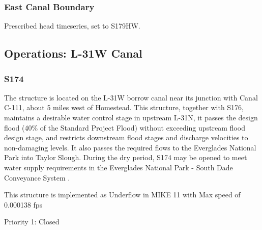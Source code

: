 \clearpage
\subsubsection{East Canal Boundary}
Prescribed head timeseries, set to S179HW.


\clearpage
\subsection{Operations: L-31W Canal}

\subsubsection{S174}

The structure is located on the L-31W borrow canal near its junction with Canal C-111, about 5 miles west of Homestead. This structure, together with S176, maintains a desirable water control stage in upstream L-31N, it passes the design flood (40\% of the Standard Project Flood) without exceeding upstream flood design stage, and restricts downstream flood stages and discharge velocities to non-damaging levels. It also passes the required flows to the Everglades National Park into Taylor Slough. During the dry period, S174 may be opened to meet water supply requirements in the Everglades National Park - South Dade Conveyance System \cite{corp2005, SFWMD1994}.

This structure is implemented as Underflow in MIKE 11 with Max speed of 0.000138 fps
\begin{packed_items}
\item Priority 1: Closed
\end{packed_items}

